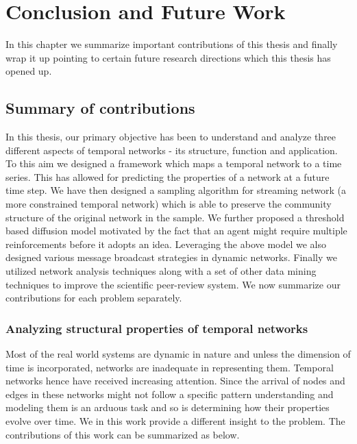\chapter[Conclusion and Future Work]{Conclusion and Future Work} 
In this chapter we summarize important contributions of this thesis and finally wrap it up pointing to certain future research directions which this thesis has opened up.

\section{Summary of contributions} 

In this thesis, our primary objective has been to understand and analyze three different aspects of temporal networks - its structure, function and application. To this aim we designed a framework which maps a temporal network to a time series. This has allowed for predicting the properties of a network at a future time step. We have then designed a sampling algorithm for streaming network (a more constrained temporal network) which is able to preserve the community structure of the original network in the sample. We further proposed a threshold based diffusion model motivated by the fact that an agent might require multiple reinforcements before it adopts an idea. Leveraging the above model we also designed various message broadcast strategies in dynamic networks. Finally we utilized network analysis techniques along with a set of other data mining techniques to improve the scientific peer-review system. We now summarize our contributions for each problem separately. 

\subsection{Analyzing structural properties of temporal networks} 

Most of the real world systems are dynamic in nature and unless the dimension of time is incorporated, networks are inadequate in representing them. Temporal networks hence have received increasing attention. Since the arrival of nodes and edges in these networks might not follow a specific pattern understanding and modeling them is an arduous task and so is determining how their properties evolve over time. We in this work provide a different insight to the problem. The contributions of this work can be summarized as below.   

